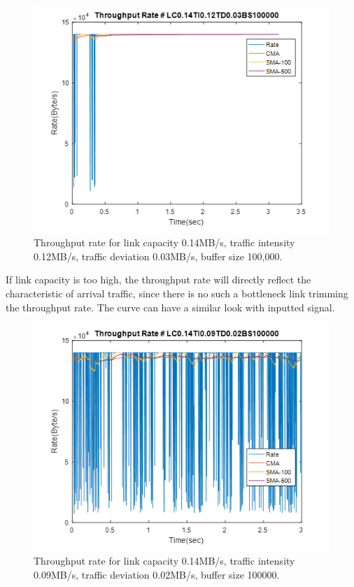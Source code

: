\documentclass[a4paper]{article}
\begin{document}
\begin{figure}
\centering
\includegraphics[width=1\textwidth]{smad.png}
\caption{\label{fig:smad} Throughput rate for link capacity 0.14MB/s, traffic intensity 0.12MB/s, traffic deviation 0.03MB/s, buffer size 100,000.}
\end{figure}


If link capacity is too high, the throughput rate will directly reflect the characteristic of arrival traffic, since there is no such a bottleneck link trimming the throughput rate. The curve can have a similar look with inputted signal.

\begin{figure}
\centering
\includegraphics[width=1\textwidth]{smad2.png}
\caption{\label{fig:sd} Throughput rate for link capacity 0.14MB/s, traffic intensity 0.09MB/s, traffic deviation 0.02MB/s, buffer size 100000.}
\end{figure}
\end{document}
